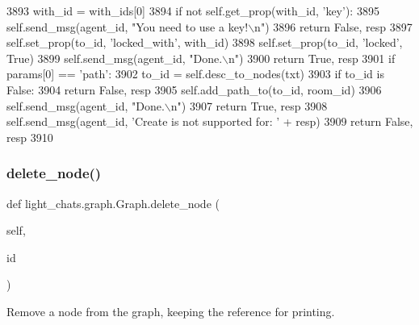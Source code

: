 \begin{DoxyCode}
3893             with\_id = with\_ids[0]
3894             \textcolor{keywordflow}{if} \textcolor{keywordflow}{not} self.get\_prop(with\_id, \textcolor{stringliteral}{'key'}):
3895                 self.send\_msg(agent\_id, \textcolor{stringliteral}{"You need to use a key!\(\backslash\)n"})
3896                 \textcolor{keywordflow}{return} \textcolor{keyword}{False}, resp
3897             self.set\_prop(to\_id, \textcolor{stringliteral}{'locked\_with'}, with\_id)
3898             self.set\_prop(to\_id, \textcolor{stringliteral}{'locked'}, \textcolor{keyword}{True})
3899             self.send\_msg(agent\_id, \textcolor{stringliteral}{"Done.\(\backslash\)n"})
3900             \textcolor{keywordflow}{return} \textcolor{keyword}{True}, resp
3901         \textcolor{keywordflow}{if} params[0] == \textcolor{stringliteral}{'path'}:
3902             to\_id = self.desc\_to\_nodes(txt)
3903             \textcolor{keywordflow}{if} to\_id \textcolor{keywordflow}{is} \textcolor{keyword}{False}:
3904                 \textcolor{keywordflow}{return} \textcolor{keyword}{False}, resp
3905             self.add\_path\_to(to\_id, room\_id)
3906             self.send\_msg(agent\_id, \textcolor{stringliteral}{"Done.\(\backslash\)n"})
3907             \textcolor{keywordflow}{return} \textcolor{keyword}{True}, resp
3908         self.send\_msg(agent\_id, \textcolor{stringliteral}{'Create is not supported for: '} + resp)
3909         \textcolor{keywordflow}{return} \textcolor{keyword}{False}, resp
3910 
\end{DoxyCode}
\mbox{\label{classlight__chats_1_1graph_1_1Graph_a703188eb5340371b8ad793ddebd2af30}} 
\subsubsection{\texorpdfstring{delete\+\_\+node()}{delete\_node()}}
{\footnotesize\ttfamily def light\+\_\+chats.\+graph.\+Graph.\+delete\+\_\+node (\begin{DoxyParamCaption}\item[{}]{self,  }\item[{}]{id }\end{DoxyParamCaption})}

\begin{DoxyVerb}Remove a node from the graph, keeping the reference for printing.
\end{DoxyVerb}
 

